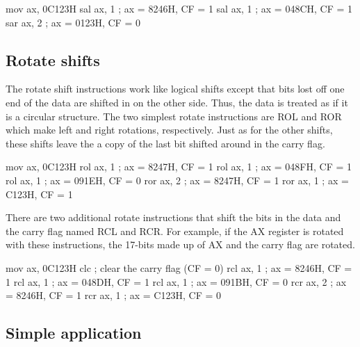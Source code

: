 \begin{AsmCodeListing}[frame=none]
      mov    ax, 0C123H
      sal    ax, 1           ; ax = 8246H, CF = 1
      sal    ax, 1           ; ax = 048CH, CF = 1
      sar    ax, 2           ; ax = 0123H, CF = 0
\end{AsmCodeListing}

\subsection{Rotate shifts}

The rotate shift instructions work like logical shifts except that
bits lost off one end of the data are shifted in on the other
side. Thus, the data is treated as if it is a circular structure. The
two simplest rotate instructions are {\code ROL}  and
{\code ROR}  which make left and right rotations,
respectively. Just as for the other shifts, these shifts leave the a
copy of the last bit shifted around in the carry flag.
\begin{AsmCodeListing}[frame=none]
      mov    ax, 0C123H
      rol    ax, 1           ; ax = 8247H, CF = 1
      rol    ax, 1           ; ax = 048FH, CF = 1
      rol    ax, 1           ; ax = 091EH, CF = 0
      ror    ax, 2           ; ax = 8247H, CF = 1
      ror    ax, 1           ; ax = C123H, CF = 1
\end{AsmCodeListing}

There are two additional rotate instructions that shift the bits in
the data and the carry flag named {\code RCL}  and {\code
RCR}.  For example, if the {\code AX} register is rotated
with these instructions, the 17-bits made up of {\code AX} and the
carry flag are rotated.
\begin{AsmCodeListing}[frame=none]
      mov    ax, 0C123H
      clc                    ; clear the carry flag (CF = 0)
      rcl    ax, 1           ; ax = 8246H, CF = 1
      rcl    ax, 1           ; ax = 048DH, CF = 1
      rcl    ax, 1           ; ax = 091BH, CF = 0
      rcr    ax, 2           ; ax = 8246H, CF = 1
      rcr    ax, 1           ; ax = C123H, CF = 0
\end{AsmCodeListing}

\subsection{Simple application\label{sect:AddBitsExample}}

